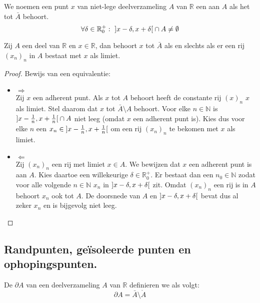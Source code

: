 \documentclass[main.tex]{subfiles}
\begin{document}
\begin{de}
  We noemen een punt $x$ van niet-lege deelverzameling $A$ van $\mathbb{R}$ een  aan $A$ als het tot $\bar{A}$ behoort.
  \[ \forall \delta \in \mathbb{R}_{0}^{+}:\ \interval[open]{x-\delta}{x+\delta} \cap A \neq \emptyset \]
\end{de}

\begin{pr}
  Zij $A$ een deel van $\mathbb{R}$ en $x\in \mathbb{R}$, dan behoort $x$ tot $\bar{A}$ als en slechts als er een rij $(x_{n})_{n}$ in $A$ bestaat met $x$ als limiet.

  \begin{proof}
    Bewijs van een equivalentie:
    \begin{itemize}
    \item $\Rightarrow$\\
      Zij $x$ een adherent punt.
      Als $x$ tot $A$ behoort heeft de constante rij $(x)_{n}$ $x$ als limiet.
      Stel daarom dat $x$ tot $\bar{A}\setminus A$ behoort.
      Voor elke $n\in \mathbb{N}$ is $\interval[open]{x-\frac{1}{n}}{x+\frac{1}{n}} \cap A$ niet leeg (omdat $x$ een adherent punt is).
      Kies dus voor elke $n$ een $x_{n} \in \interval[open]{x-\frac{1}{n}}{x+\frac{1}{n}}$ om een rij $(x_{n})_{n}$ te bekomen met $x$ als limiet.
    \item $\Leftarrow$\\
      Zij $(x_{n})_{n}$ een rij met limiet $x\in A$. We bewijzen dat $x$ een adherent punt is aan $A$.
      Kies daartoe een willekeurige $\delta \in \mathbb{R}_{0}^{+}$.
      Er bestaat dan een $n_{0}\in \mathbb{N}$ zodat voor alle volgende $n\in\mathbb{N}$ $x_{n}$ in $\interval[open]{x-\delta}{x+\delta}$ zit.
      Omdat $(x_{n})_{n}$ een rij is in $A$ behoort $x_{n}$ ook tot $A$.
      De doorsnede van $A$ en $\interval[open]{x-\delta}{x+\delta}$ bevat dus al zeker $x_{n}$ en is bijgevolg niet leeg.
    \end{itemize}
  \end{proof}
\end{pr}

\subsection{Randpunten, ge\"isoleerde punten en ophopingspunten.}
\label{sec:randp-geis-punt}

\begin{de}
  De  $\partial A$ van een deelverzameling $A$ van $\mathbb{R}$ definieren we als volgt:
  \[ \partial A = \bar{A} \setminus \mathring{A} \]
\end{de}
\end{document}

